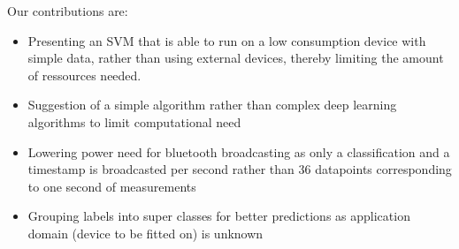 Our contributions are:
\begin{itemize}
    \item Presenting an SVM that is able to run on a low consumption device with simple data, rather than using external devices, thereby limiting the amount of ressources needed.
    \item Suggestion of a simple algorithm rather than complex deep learning algorithms to limit computational need
    \item Lowering power need for bluetooth broadcasting as only a classification and a timestamp is broadcasted per second rather than 36 datapoints corresponding to one second of measurements
    \item Grouping labels into super classes for better predictions as application domain (device to be fitted on) is unknown
\end{itemize}